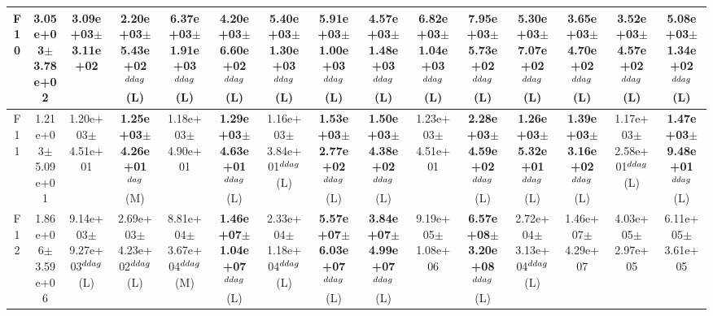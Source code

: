 \begin{table}[!t]
\begin{tabular}{c|cccccccccccccc}
F10  & 3.05e+03$\pm$3.78e+02  & 3.09e+03$\pm$3.11e+02   & 2.20e+03$\pm$5.43e+02$^{\\ddag}$ (L)  & \textbf{6.37e+03$\pm$1.91e+03}$^{\\ddag}$ (L)  & \textbf{4.20e+03$\pm$6.60e+02}$^{\\ddag}$ (L)  & \textbf{5.40e+03$\pm$1.30e+03}$^{\\ddag}$ (L)  & \textbf{5.91e+03$\pm$1.00e+03}$^{\\ddag}$ (L)  & \textbf{4.57e+03$\pm$1.48e+03}$^{\\ddag}$ (L)  & \textbf{6.82e+03$\pm$1.04e+03}$^{\\ddag}$ (L)  & \textbf{7.95e+03$\pm$5.73e+02}$^{\\ddag}$ (L)  & \textbf{5.30e+03$\pm$7.07e+02}$^{\\ddag}$ (L)  & \textbf{3.65e+03$\pm$4.70e+02}$^{\\ddag}$ (L)  & \textbf{3.52e+03$\pm$4.57e+02}$^{\\ddag}$ (L)  & \textbf{5.08e+03$\pm$1.34e+02}$^{\\ddag}$ (L) \\ \hline
F11  & 1.21e+03$\pm$5.09e+01  & 1.20e+03$\pm$4.51e+01   & \textbf{1.25e+03$\pm$4.26e+01}$^{\\dag}$ (M)  & 1.18e+03$\pm$4.90e+01   & \textbf{1.29e+03$\pm$4.63e+01}$^{\\ddag}$ (L)  & 1.16e+03$\pm$3.84e+01$^{\\ddag}$ (L)  & \textbf{1.53e+03$\pm$2.77e+02}$^{\\ddag}$ (L)  & \textbf{1.50e+03$\pm$4.38e+02}$^{\\ddag}$ (L)  & 1.23e+03$\pm$4.51e+01   & \textbf{2.28e+03$\pm$4.59e+02}$^{\\ddag}$ (L)  & \textbf{1.26e+03$\pm$5.32e+01}$^{\\ddag}$ (L)  & \textbf{1.39e+03$\pm$3.16e+02}$^{\\ddag}$ (L)  & 1.17e+03$\pm$2.58e+01$^{\\ddag}$ (L)  & \textbf{1.47e+03$\pm$9.48e+01}$^{\\ddag}$ (L) \\ \hline
F12  & 1.86e+06$\pm$3.59e+06  & 9.14e+03$\pm$9.27e+03$^{\\ddag}$ (L)  & 2.69e+03$\pm$4.23e+02$^{\\ddag}$ (L)  & 8.81e+04$\pm$3.67e+04$^{\\ddag}$ (M)  & \textbf{1.46e+07$\pm$1.04e+07}$^{\\ddag}$ (L)  & 2.33e+04$\pm$1.18e+04$^{\\ddag}$ (L)  & \textbf{5.57e+07$\pm$6.03e+07}$^{\\ddag}$ (L)  & \textbf{3.84e+07$\pm$4.99e+07}$^{\\ddag}$ (L)  & 9.19e+05$\pm$1.08e+06   & \textbf{6.57e+08$\pm$3.20e+08}$^{\\ddag}$ (L)  & 2.72e+04$\pm$3.13e+04$^{\\ddag}$ (L)  & 1.46e+07$\pm$4.29e+07   & 4.03e+05$\pm$2.97e+05   & 6.11e+05$\pm$3.61e+05  \\ \hline

\end{tabular}
\end{table}
